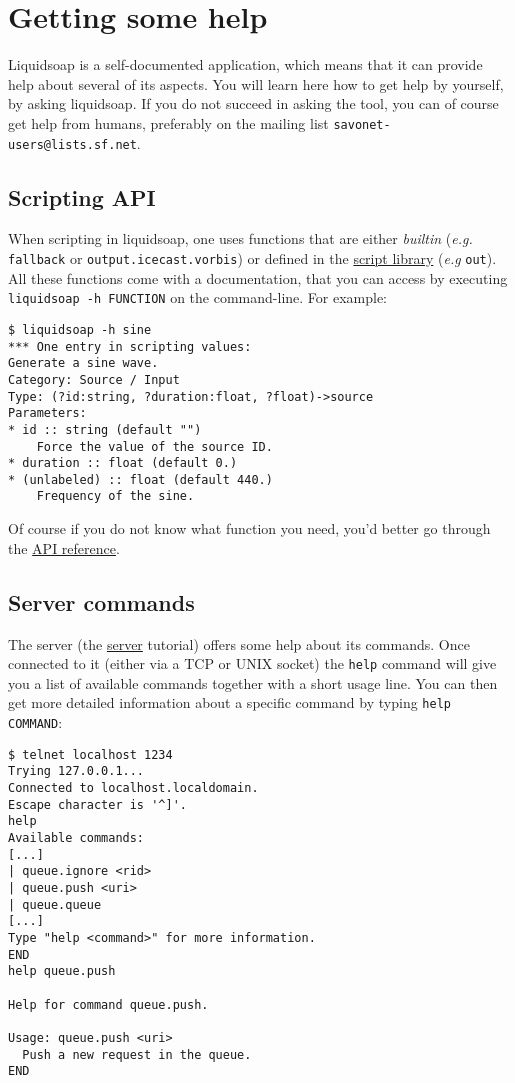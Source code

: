 \section{Getting some help}
Liquidsoap is a self-documented application, which means that it can provide
help about several of its aspects.  You will learn here how to get help by
yourself, by asking liquidsoap. If you do not succeed in asking the tool, you
can of course get help from humans, preferably on the mailing list
\verb+savonet-users@lists.sf.net+.

\subsection{Scripting API}
When scripting in liquidsoap, one uses functions that are either \emph{builtin}
(\emph{e.g.} \verb+fallback+ or \verb+output.icecast.vorbis+) or defined in the
\href{script_loading.html}{script library} (\emph{e.g} \verb+out+).  All these
functions come with a documentation, that you can access by executing
\verb+liquidsoap -h FUNCTION+ on the command-line. For example:

\begin{verbatim}
$ liquidsoap -h sine
*** One entry in scripting values:
Generate a sine wave.
Category: Source / Input
Type: (?id:string, ?duration:float, ?float)->source
Parameters:
* id :: string (default "")
    Force the value of the source ID.
* duration :: float (default 0.)
* (unlabeled) :: float (default 440.)
    Frequency of the sine.
\end{verbatim}
Of course if you do not know what function you need, you'd better go through the
\href{reference.html}{API reference}.

\subsection{Server commands}
The server (\cf the \href{server.html}{server} tutorial) offers some help
about its commands.  Once connected to it (either via a TCP or UNIX socket) the
\verb+help+ command will give you a list of available commands together with a
short usage line.  You can then get more detailed information about a specific
command by typing \verb+help COMMAND+:

\begin{verbatim}
$ telnet localhost 1234
Trying 127.0.0.1...
Connected to localhost.localdomain.
Escape character is '^]'.
help
Available commands:
[...]
| queue.ignore <rid>
| queue.push <uri>
| queue.queue
[...]
Type "help <command>" for more information.
END
help queue.push

Help for command queue.push.

Usage: queue.push <uri>
  Push a new request in the queue.
END
\end{verbatim}

